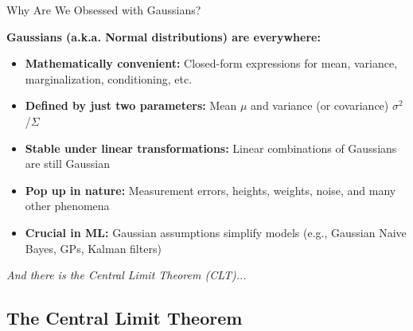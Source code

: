 \documentclass{beamer}
\begin{document}
\begin{frame}{Why Are We Obsessed with Gaussians?}

\textbf{Gaussians (a.k.a. Normal distributions) are everywhere:}

\vspace{1em}
\begin{itemize}
  \item \textbf{Mathematically convenient:} Closed-form expressions for mean, variance, marginalization, conditioning, etc.
  \item \textbf{Defined by just two parameters:} Mean $\mu$ and variance (or covariance) $\sigma^2$/$\Sigma$
  \item \textbf{Stable under linear transformations:} Linear combinations of Gaussians are still Gaussian
  \item \textbf{Pop up in nature:} Measurement errors, heights, weights, noise, and many other phenomena
  \item \textbf{Crucial in ML:} Gaussian assumptions simplify models (e.g., Gaussian Naive Bayes, GPs, Kalman filters)
\end{itemize}

\vspace{1em}
\textit{And there is the Central Limit Theorem (CLT)...}

\end{frame}

\subsection{The Central Limit Theorem}
\end{document}
